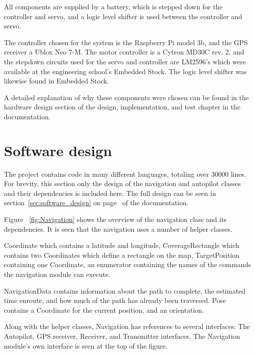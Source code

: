 All components are supplied by a battery, which is stepped down for the controller and servo, and a logic level shifter is used between the controller and servo.

The controller chosen for the system is the Raspberry Pi model 3b, and the GPS receiver a Ublox Neo 7-M. The motor controller is a Cytron MD30C rev. 2, and the stepdown circuits used for the servo and controller are LM2596's which were available at the engineering school's Embedded Stock. The logic level shifter was likewise found in Embedded Stock.

A detailed explanation of why these components were chosen can be found in the hardware design section of the design, implementation, and test chapter in the documentation.

\section{Software design}
The project contains code in many different languages, totaling over 30000 lines. For brevity, this section only the design of the navigation and autopilot classes and their dependencies is included here. The full design can be seen in section~\ref{sec:software_design} on page~\pageref{sec:software_design} of the documentation.

Figure ~\ref{fig:Navigation} shows the overview of the navigation class and its dependencies. It is seen that the navigation uses a number of helper classes.

Coordinate which contains a latitude and longitude, CoverageRectangle which contains two Coordinates which define a rectangle on the map, TargetPosition containing one Coordinate, an enumerator containing the names of the commands the navigation module can execute.

NavigationData contains information about the path to complete, the estimated time enroute, and how much of the path has already been traversed. Pose contains a Coordinate for the current position, and an orientation. 

Along with the helper classes, Navigation has references to several interfaces: The Autopilot, GPS receiver, Receiver, and Transmitter interfaces. The Navigation module's own interface is seen at the top of the figure.

